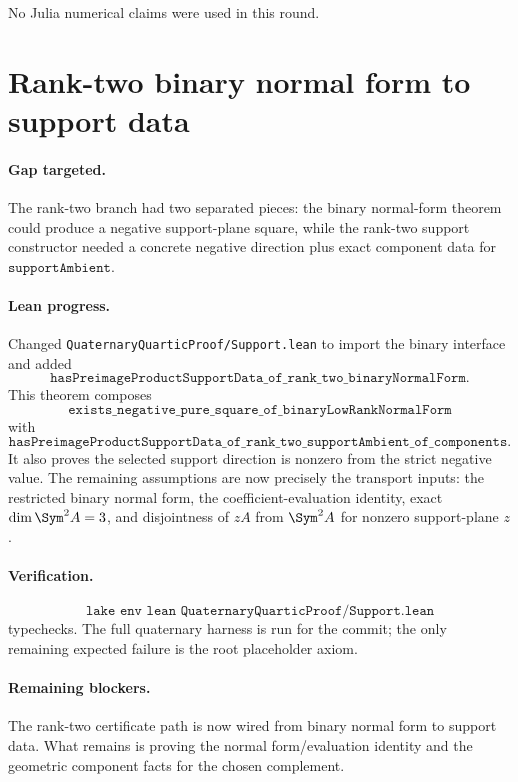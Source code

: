 \documentclass[11pt]{article}
\begin{document}
No Julia numerical claims were used in this round.

\section*{Rank-two binary normal form to support data}

\paragraph{Gap targeted.}
The rank-two branch had two separated pieces: the binary normal-form theorem
could produce a negative support-plane square, while the rank-two support
constructor needed a concrete negative direction plus exact component data for
\(\texttt{supportAmbient}\).

\paragraph{Lean progress.}
Changed \texttt{QuaternaryQuarticProof/Support.lean} to import the binary
interface and added
\[
\texttt{hasPreimageProductSupportData\_of\_rank\_two\_binaryNormalForm}.
\]
This theorem composes
\[
\texttt{exists\_negative\_pure\_square\_of\_binaryLowRankNormalForm}
\]
with
\[
\texttt{hasPreimageProductSupportData\_of\_rank\_two\_supportAmbient\_of\_components}.
\]
It also proves the selected support direction is nonzero from the strict
negative value.  The remaining assumptions are now precisely the transport
inputs: the restricted binary normal form, the coefficient-evaluation identity,
exact \(\dim\Sym^2 A=3\), and disjointness of \(zA\) from \(\Sym^2A\) for
nonzero support-plane \(z\).

\paragraph{Verification.}
\[
\texttt{lake env lean QuaternaryQuarticProof/Support.lean}
\]
typechecks.  The full quaternary harness is run for the commit; the only
remaining expected failure is the root placeholder axiom.

\paragraph{Remaining blockers.}
The rank-two certificate path is now wired from binary normal form to support
data.  What remains is proving the normal form/evaluation identity and the
geometric component facts for the chosen complement.
\end{document}
